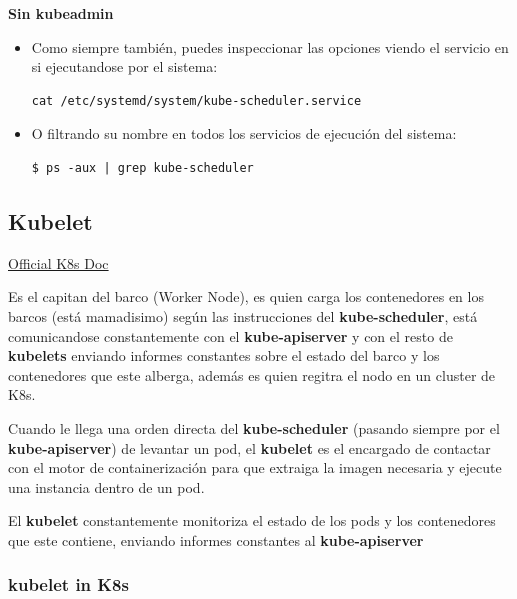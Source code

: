 \documentclass{article}
\newenvironment{codetemplate}[1][]{%
  \mybasecolorbox[#1]
  \itshape
}{%
  \endmybasecolorbox
}
\begin{document}
\textbf{Sin kubeadmin}

\begin{itemize}
    \item Como siempre también, puedes inspeccionar las opciones viendo el servicio en si ejecutandose por el sistema:
\begin{codetemplate}{}
\begin{verbatim}
cat /etc/systemd/system/kube-scheduler.service
\end{verbatim}
\end{codetemplate}

    \item O filtrando su nombre en todos los servicios de ejecución del sistema:
\begin{codetemplate}{}
\begin{verbatim}
$ ps -aux | grep kube-scheduler
\end{verbatim}
\end{codetemplate}
\end{itemize}

\subsection{Kubelet}

\href{https://kubernetes.io/docs/reference/command-line-tools-reference/kubelet/}{Official K8s Doc}

Es el capitan del barco (Worker Node), es quien carga los contenedores en los barcos (está mamadisimo) según las instrucciones del \textbf{kube-scheduler}, está comunicandose constantemente con el \textbf{kube-apiserver} y con el resto de \textbf{kubelets} enviando informes constantes sobre el estado del barco y los contenedores que este alberga, además es quien regitra el nodo en un cluster de K8s.

Cuando le llega una orden directa del \textbf{kube-scheduler} (pasando siempre por el \textbf{kube-apiserver}) de levantar un pod, el \textbf{kubelet} es el encargado de contactar con el motor de containerización para que extraiga la imagen necesaria y ejecute una instancia dentro de un pod.

El \textbf{kubelet} constantemente monitoriza el estado de los pods y los contenedores que este contiene, enviando informes constantes al \textbf{kube-apiserver}

\subsubsection{kubelet in K8s}
\end{document}
